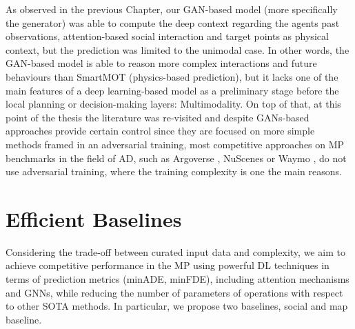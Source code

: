 As observed in the previous Chapter, our \ac{GAN}-based model (more specifically the generator) was able to compute the deep context regarding the agents past observations, attention-based social interaction and target points as physical context, but the prediction was limited to the unimodal case. In other words, the \ac{GAN}-based model is able to reason more complex interactions and future behaviours than SmartMOT (physics-based prediction), but it lacks one of the main features of a deep learning-based model as a preliminary stage before the local planning or decision-making layers: Multimodality. On top of that, at this point of the thesis the literature was re-visited and despite \acp{GAN}-based approaches \cite{sadeghian2019sophie, dendorfer2020goal, gupta2018social, gomez2022exploring} provide certain control since they are focused on more simple methods framed in an adversarial training, most competitive approaches on \ac{MP} benchmarks in the field of \ac{AD}, such as Argoverse \cite{chang2019argoverse}, NuScenes \cite{caesar2020nuscenes} or Waymo \cite{ettinger2021large}, do not use adversarial training, where the training complexity is one the main reasons.

\section{Efficient Baselines}
\label{sec:6_efficient_baselines}

Considering the trade-off between curated input data and complexity, we aim to achieve competitive performance in the \ac{MP} using powerful DL techniques in terms of prediction metrics (\ac{minADE}, \ac{minFDE}), including attention mechanisms and \acp{GNN}, while reducing the number of parameters of operations with respect to other \ac{SOTA} methods. In particular, we propose two baselines, social and map baseline. 

